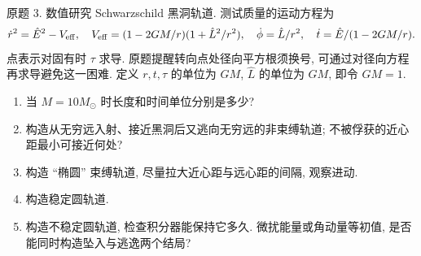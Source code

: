 \begin{exercise}\label{ps:11.3}
原题 3. 数值研究 Schwarzschild 黑洞轨道. 测试质量的运动方程为
\[
\dot r^2=\hat E^2-V_{\rm eff},\quad
V_{\rm eff}=(1-2GM/r)(1+\hat L^2/r^2),\quad
\dot\phi=\hat L/r^2,\quad \dot t=\hat E/(1-2GM/r).
\]
点表示对固有时 $\tau$ 求导. 原题提醒转向点处径向平方根须换号, 可通过对径向方程再求导避免这一困难. 定义 $r,t,\tau$ 的单位为 $GM$, $\hat L$ 的单位为 $GM$, 即令 $GM=1$.
\begin{enumerate}[label=(\alph*)]
\item 当 $M=10M_\odot$ 时长度和时间单位分别是多少?
\item 构造从无穷远入射、接近黑洞后又逃向无穷远的非束缚轨道; 不被俘获的近心距最小可接近何处?
\item 构造 ``椭圆'' 束缚轨道, 尽量拉大近心距与远心距的间隔, 观察进动.
\item 构造稳定圆轨道.
\item 构造不稳定圆轨道, 检查积分器能保持它多久. 微扰能量或角动量等初值, 是否能同时构造坠入与逃逸两个结局?
\end{enumerate}
\end{exercise}
